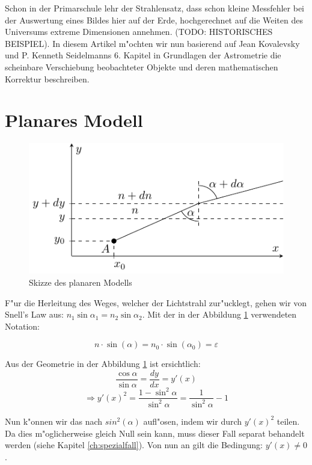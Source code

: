 \begin{refsection}
Schon in der Primarschule lehr der Strahlensatz, dass schon kleine Messfehler bei der Auswertung eines Bildes hier auf der Erde, hochgerechnet auf die Weiten des Universums extreme Dimensionen annehmen. (TODO: HISTORISCHES BEISPIEL). 
In diesem Artikel m"ochten wir nun basierend auf Jean Kovalevsky und P. Kenneth Seidelmanns 6. Kapitel in Grundlagen der Astrometrie \cite{licht:astrometry} die scheinbare Verschiebung beobachteter Objekte und deren mathematischen Korrektur beschreiben. 

\section{Planares Modell} 
\begin{figure}
\centering
\includegraphics{licht/standalone/fig_planar_skizze.pdf}
\caption{Skizze des planaren Modells}
\label{fig:13_1}
\end{figure}


F"ur die Herleitung des Weges, welcher der Lichtstrahl zur"ucklegt, gehen wir von Snell's Law aus: $n_1 \sin \alpha_1 = n_2 \sin \alpha_2$.
Mit der in der Abbildung \ref{fig:13_1} verwendeten Notation:

\begin{equation} \label{eq:13_1}
  n \cdot \sin(\alpha) = n_0 \cdot \sin(\alpha_0) = \varepsilon
\end{equation}

Aus der Geometrie in der Abbildung \ref{fig:13_1} ist ersichtlich:
$$\frac{\cos \alpha}{\sin \alpha} = \frac{dy}{dx} = y'(x)$$
$$\Rightarrow y'(x)^2 = \frac{1 - \sin^2 \alpha}{\sin^2 \alpha} = \frac{1}{\sin^2 \alpha} - 1$$

Nun k"onnen wir das nach $sin^2(\alpha)$ aufl"osen, indem wir durch $y'(x)^2$ teilen. 
Da dies m"oglicherweise gleich Null sein kann, muss dieser Fall separat behandelt werden (siehe Kapitel \ref{ch:spezialfall}). 
Von nun an gilt die Bedingung: $y'(x) \neq 0$.


\end{refsection}
